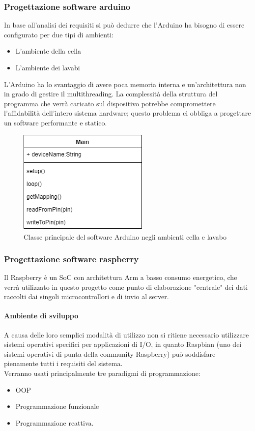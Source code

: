 \documentclass[12pt]{article}
\begin{document}
\subsubsection{Progettazione software arduino}
In base all'analisi dei requisiti si può dedurre che l'Arduino ha bisogno di essere configurato per due tipi di ambienti:
\begin{itemize}
\item L'ambiente della cella
\item L'ambiente dei lavabi
\end{itemize}
L'Arduino ha lo svantaggio di avere poca memoria interna e un'architettura non in grado di gestire il multithreading. La complessità della struttura del programma che verrà caricato sul dispositivo potrebbe compromettere l'affidabilità dell'intero sistema hardware; questo problema ci obbliga a progettare un software performante e statico.
\begin{figure}[h!]
\centering
	\includegraphics[scale=0.55]{img/parteLocale/SoftwareArduino.png}  
    \caption{Classe principale del software Arduino negli ambienti cella e lavabo}
\end{figure}
\newpage
\subsubsection{Progettazione software raspberry}
Il Raspberry è un SoC con architettura Arm a basso consumo energetico, che verrà utilizzato in questo progetto come punto di elaborazione "centrale" dei dati raccolti dai singoli microcontrollori e di invio al server.
\paragraph{Ambiente di sviluppo}
A causa delle loro semplici modalità di utilizzo non si ritiene necessario utilizzare sistemi operativi specifici per applicazioni di I/O, in quanto Raspbian (uno dei sistemi operativi di punta della community Raspberry) può soddisfare pienamente tutti i requisiti del sistema.\\ Verranno usati principalmente tre paradigmi di programmazione: 
\begin{itemize}
\item OOP
\item Programmazione funzionale 
\item Programmazione reattiva. 
\end{itemize}
\end{document}

